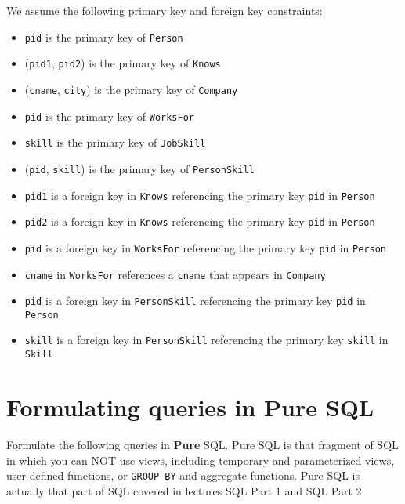 We assume the following primary key and foreign key constraints:
\begin{itemize}
\item {\tt pid} is the primary key of {\tt Person}
\item ({\tt pid1}, {\tt pid2}) is the primary key of {\tt Knows}
\item ({\tt cname}, {\tt city}) is the primary key of {\tt Company}
\item {\tt pid} is the primary key of {\tt WorksFor}
\item {\tt skill} is the primary key of {\tt JobSkill}
\item ({\tt pid}, {\tt skill}) is the primary key of {\tt PersonSkill}
\item {\tt pid1} is a foreign key in {\tt Knows} referencing the primary key {\tt pid} in {\tt Person}
\item {\tt pid2} is a foreign key in {\tt Knows} referencing the primary key {\tt pid} in {\tt Person}
\item {\tt pid} is a foreign key in {\tt WorksFor} referencing the primary key {\tt pid} in {\tt Person}
\item {\tt cname} in {\tt WorksFor} references a {\tt cname} that appears in {\tt Company}
\item {\tt pid} is a foreign key in {\tt PersonSkill} referencing the primary key {\tt pid} in {\tt Person}
\item {\tt skill} is a foreign key in {\tt PersonSkill} referencing the primary key {\tt skill} in {\tt Skill}
\end{itemize}



\newpage
\section{Formulating queries in Pure SQL}

Formulate the following queries in {\bf Pure} SQL.   Pure SQL is that fragment of SQL in which you can NOT
use views, 
including temporary and parameterized views, user-defined functions, or {\tt GROUP BY} and aggregate functions.
Pure SQL is actually that part of SQL covered in lectures SQL Part 1 and SQL Part 2.


